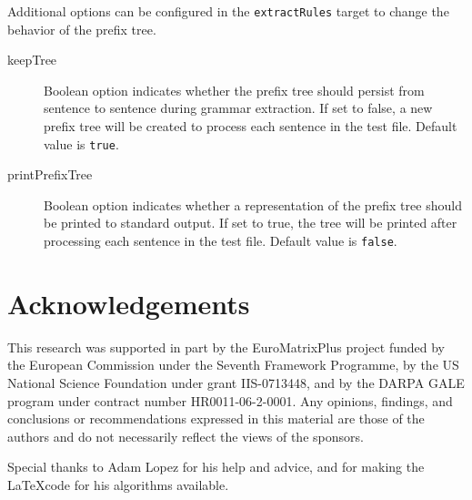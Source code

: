 \documentclass{pbml}
\begin{document}
Additional options can be configured in the {\tt extractRules} target to change the behavior of the prefix tree.

\begin{description}
	\item[keepTree] Boolean option indicates whether the prefix tree should persist from sentence to sentence during grammar extraction. If set to false, a new prefix tree will be created to process each sentence in the test file. Default value is {\tt true}.

	\item[printPrefixTree] Boolean option indicates whether a representation of the prefix tree should be printed to standard output. If set to true, the tree will be printed after processing each sentence in the test file. Default value is {\tt false}.

\end{description}


\section*{Acknowledgements}

This research was supported in part by the EuroMatrixPlus project funded by
the European Commission under the Seventh Framework Programme, by the US National Science Foundation under grant IIS-0713448, and by the DARPA GALE program under contract number HR0011-06-2-0001.  Any opinions, findings, and conclusions or recommendations expressed in this material are those of the authors and do not necessarily reflect the views of the sponsors.

Special thanks to Adam Lopez for his help and advice, and for making the \LaTeX code for his algorithms available. 





% 
\end{document}
